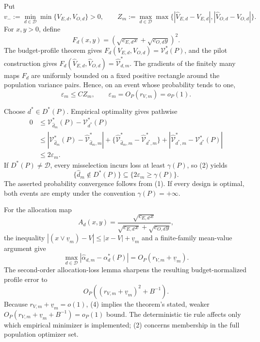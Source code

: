 Put
\[
 v_-:=\min_{d\in\mathcal D}\min\{V_{E,d},V_{O,d}\}>0,
 \qquad
 Z_m:=\max_{d\in\mathcal D}\max\{|\widehat V_{E,d}-V_{E,d}|,
 |\widehat V_{O,d}-V_{O,d}|\}.
\]
For \(x,y>0\), define
\[
 F_d(x,y)=\left(\sqrt{c_{E,d}x}+\sqrt{c_{O,d}y}\right)^2.
\]
The budget-profile theorem gives \(F_d(V_{E,d},V_{O,d})=\mathcal V_d^*(P)\), and the pilot construction gives \(F_d(\widehat V_{E,d},\widehat V_{O,d})=\widehat{\mathcal V}_{d,m}^*\).  The gradients of the finitely many maps \(F_d\) are uniformly bounded on a fixed positive rectangle around the population variance pairs.  Hence, on an event whose probability tends to one,
\[
 \varepsilon_m\le C Z_m,
 \qquad
 \varepsilon_m=O_P(r_{V,m})=o_P(1). \tag{1}
\]

Choose \(d^*\in D^*(P)\).  Empirical optimality gives pathwise
\[
\begin{aligned}
0&\le \mathcal V_{\widehat d_m}^*(P)-\mathcal V_{d^*}^*(P)\\
&\le |\mathcal V_{\widehat d_m}^*(P)-\widehat{\mathcal V}_{\widehat d_m,m}^*|
 +\{\widehat{\mathcal V}_{\widehat d_m,m}^*-\widehat{\mathcal V}_{d^*,m}^*\}
 +|\widehat{\mathcal V}_{d^*,m}^*-\mathcal V_{d^*}^*(P)|\\
&\le2\varepsilon_m.
\end{aligned}\tag{2}
\]
If \(D^*(P)\ne\mathcal D\), every misselection incurs loss at least \(\gamma(P)\), so (2) yields
\[
 \{\widehat d_m\notin D^*(P)\}\subseteq\{2\varepsilon_m\ge\gamma(P)\}.
\]
The asserted probability convergence follows from (1).  If every design is optimal, both events are empty under the convention \(\gamma(P)=+\infty\).

For the allocation map
\[
 A_d(x,y)=\frac{\sqrt{c_{E,d}x}}
 {\sqrt{c_{E,d}x}+\sqrt{c_{O,d}y}},
\]
the inequality \(|(x\vee\underline v_m)-V|\le|x-V|+\underline v_m\) and a finite-family mean-value argument give
\[
 \max_{d\in\mathcal D}|\widehat\alpha_{d,m}-\alpha_d^*(P)|
 =O_P(r_{V,m}+\underline v_m). \tag{3}
\]
The second-order allocation-loss lemma sharpens the resulting budget-normalized profile error to
\[
 O_P\!\left((r_{V,m}+\underline v_m)^2+B^{-1}\right). \tag{4}
\]
Because \(r_{V,m}+\underline v_m=o(1)\), (4) implies the theorem's stated, weaker
\(O_P(r_{V,m}+\underline v_m+B^{-1})=o_P(1)\) bound.  The deterministic tie rule affects only which empirical minimizer is implemented; (2) concerns membership in the full population optimizer set.